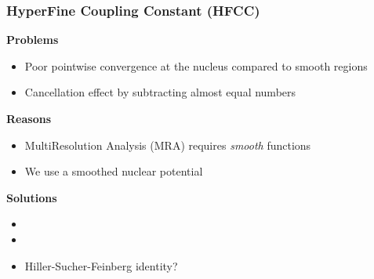 \begin{frame}
\frametitle{HyperFine Coupling Constant (HFCC)}
\scriptsize

\textbf{Problems}
\begin{itemize}
\item Poor pointwise convergence at the nucleus compared to smooth regions
\item Cancellation effect by subtracting almost equal numbers
\end{itemize}

\vspace{5mm}

\textbf{Reasons}
\begin{itemize}
\item MultiResolution Analysis (MRA) requires \emph{smooth} functions
\item We use a smoothed nuclear potential
\end{itemize}

\vspace{5mm}

\textbf{Solutions}
\begin{itemize}
\item {}
\item {}
\item Hiller-Sucher-Feinberg identity?
\end{itemize}

\end{frame}

